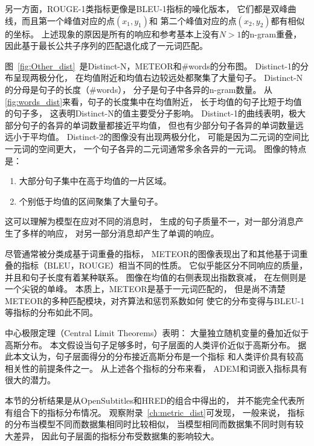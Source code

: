 另一方面，ROUGE-1类指标更像是BLEU-1指标的噪化版本，
它们都是双峰曲线，而且第一个峰值对应的点$(x_1, y_1)$和
第二个峰值对应的点$(x_2, y_2)$都有相似的坐标。
上述现象的原因是所有的响应和参考基本上没有$N > 1$的n-gram重叠，
因此基于最长公共子序列的匹配退化成了一元词匹配。

图~\ref{fig:Other_dist}~是Distinct-N，METEOR和\#words的分布图。
Distinct-1的分布呈现两极分化，
在均值附近和均值右边较远处都聚集了大量句子。
Distinct-N的分母是句子的长度（\#words），
分子是句子中各异的n-gram数量。
从\ref{fig:words_dist}来看，句子的长度集中在均值附近，
长于均值的句子比短于均值的句子多，
这表明Distinct-N的值主要受分子影响。
Distinct-1的曲线表明，极大部分句子的各异的单词数量都接近平均值，
但也有少部分句子各异的单词数量远远小于平均值。
Distinct-2的图像没有出现两极分化，
可能是因为二元词的空间比一元词的空间更大，
一个句子各异的二元词通常多余各异的一元词。
图像的特点是：
\begin{enumerate}
    \item 大部分句子集中在高于均值的一片区域。
    \item 个别低于均值的区间聚集了大量句子。
\end{enumerate}
这可以理解为模型在应对不同的消息时，
生成的句子质量不一，对一部分消息产生了多样的响应，
对另一部分消息却产生了单调的响应。


尽管通常被分类成基于词重叠的指标，
METEOR的图像表现出了和其他基于词重叠的指标（BLEU，ROUGE）相当不同的性质。
它似乎能区分不同响应的质量，并且和句子长度有着某种联系。
图像在均值的右侧表现出指数衰减， 在左侧则是一个尖锐的单峰。
本质上，METEOR是基于一元词匹配的，
但是尚不清楚METEOR的多种匹配模块，对齐算法和惩罚系数如何
使它的分布变得与BLEU-1等指标的分布如此不同。

中心极限定理（Central Limit Theorems）表明：
大量独立随机变量的叠加近似于高斯分布。
本文假设当句子足够多时，句子层面的人类评价近似于高斯分布。
据此本文认为，句子层面得分的分布接近高斯分布是一个指标
和人类评价具有较高相关性的前提条件之一。
从上述各个指标的分布来看， ADEM和词嵌入指标具有很大的潜力。

本节的分析结果是从OpenSubtitles和HRED的组合中得出的，
并不能完全代表所有组合下的指标分布情况。
观察附录~\ref{ch:metric_dist}可发现， 一般来说，
指标的分布当模型不同而数据集相同时比较相似，
当模型相同而数据集不同时则有较大差异，
因此句子层面的指标分布受数据集的影响较大。

